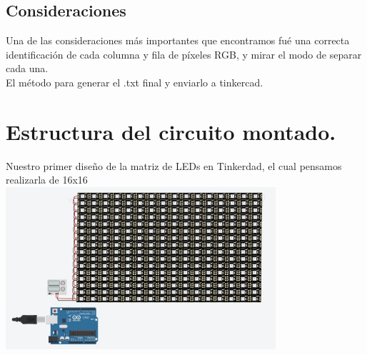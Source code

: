 \documentclass{article}
\begin{document}
\subsection{Consideraciones}
Una de las consideraciones más importantes que encontramos fué una correcta identificación de cada columna y fila de píxeles RGB, y mirar el modo de separar cada una.\\
El método para generar el .txt final y enviarlo a tinkercad.\\

\section{Estructura del circuito montado.}
Nuestro primer diseño de la matriz de LEDs en Tinkerdad, el cual pensamos realizarla de 16x16\\
\includegraphics[width=10cm]{Imagenes/circuito_1.jpeg}
\end{document}
